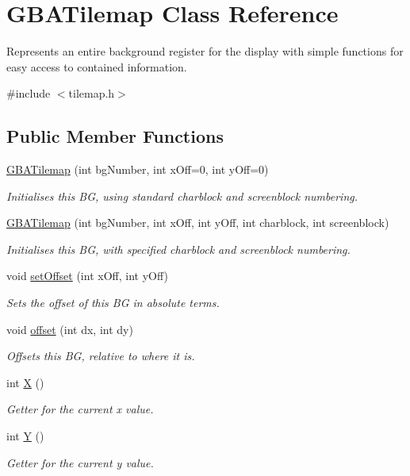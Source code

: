 \hypertarget{class_g_b_a_tilemap}{\section{G\-B\-A\-Tilemap Class Reference}
\label{class_g_b_a_tilemap}
}


Represents an entire background register for the display with simple functions for easy access to contained information.  




{\ttfamily \#include $<$tilemap.\-h$>$}

\subsection*{Public Member Functions}
\begin{DoxyCompactItemize}
\item 
\hyperlink{class_g_b_a_tilemap_af97e2847378557845a9677a22f54b3c8}{G\-B\-A\-Tilemap} (int bg\-Number, int x\-Off=0, int y\-Off=0)
\begin{DoxyCompactList}\small\item\em Initialises this B\-G, using standard charblock and screenblock numbering. \end{DoxyCompactList}\item 
\hyperlink{class_g_b_a_tilemap_a478fb5b5fe0274b6eba638b2643dd7a7}{G\-B\-A\-Tilemap} (int bg\-Number, int x\-Off, int y\-Off, int charblock, int screenblock)
\begin{DoxyCompactList}\small\item\em Initialises this B\-G, with specified charblock and screenblock numbering. \end{DoxyCompactList}\item 
void \hyperlink{class_g_b_a_tilemap_aa965c5ff1b0738466d2336ee02a329f4}{set\-Offset} (int x\-Off, int y\-Off)
\begin{DoxyCompactList}\small\item\em Sets the offset of this B\-G in absolute terms. \end{DoxyCompactList}\item 
void \hyperlink{class_g_b_a_tilemap_a153737902839590c84c81fc84415a39b}{offset} (int dx, int dy)
\begin{DoxyCompactList}\small\item\em Offsets this B\-G, relative to where it is. \end{DoxyCompactList}\item 
int \hyperlink{class_g_b_a_tilemap_a682ab6f960941dfde2bfc9c2f0e05796}{X} ()
\begin{DoxyCompactList}\small\item\em Getter for the current x value. \end{DoxyCompactList}\item 
int \hyperlink{class_g_b_a_tilemap_a6107b365da9ce64dec7eba818e889046}{Y} ()
\begin{DoxyCompactList}\small\item\em Getter for the current y value. \end{DoxyCompactList}\end{DoxyCompactItemize}
